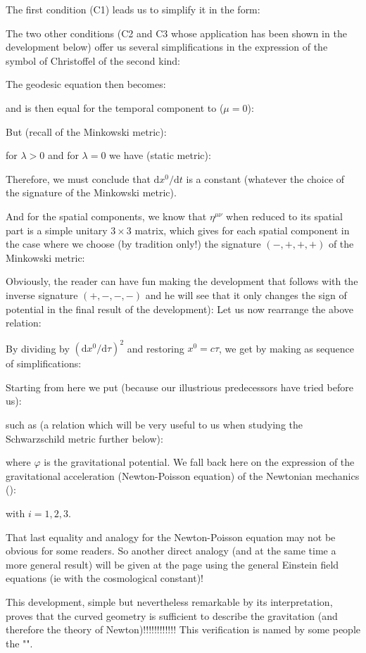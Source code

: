 	The first condition (C1) leads us to simplify it in the form:
	
	The two other conditions (C2 and C3 whose application has been shown in the development below) offer us several simplifications in the expression of the symbol of Christoffel of the second kind:
	
	The geodesic equation then becomes:
	
	and is then equal for the temporal component to ($\mu=0$):
	
	But (recall of the Minkowski metric):
	
	for $\lambda>0$ and for $\lambda=0$ we have (static metric):
	
	Therefore, we must conclude that $\mathrm{d}x^0/\mathrm{d}t$ is a constant (whatever the choice of the signature of the Minkowski metric).

	And for the spatial components, we know that $\eta^{\mu\nu}$ when reduced to its spatial part is a simple unitary $3\times 3$ matrix, which gives for each spatial component in the case where we choose (by tradition only!) the signature $(-, +, +, +)$ of the Minkowski metric:
	
	Obviously, the reader can have fun making the development that follows with the inverse signature $(+, -, -, -)$ and he will see that it only changes the sign of potential in the final result of the development):
	Let us now rearrange the above relation:
	
	By dividing by $(\mathrm{d}x^0/\mathrm{d}\tau)^2$ and restoring $x^0=c\tau$, we get by making as sequence of simplifications:
	
	Starting from here we put (because our illustrious predecessors have tried before us):
	
	such as (a relation which will be very useful to us when studying the Schwarzschild metric further below):
	
	where $\varphi$ is the gravitational potential. We fall back here on the expression of the gravitational acceleration (Newton-Poisson equation) of the Newtonian mechanics ():
	
	with $i=1,2,3$.
	\begin{tcolorbox}[title=Remark,colframe=black,arc=10pt]
	That last equality and analogy for the Newton-Poisson equation may not be obvious for some readers. So another direct analogy (and at the same time a more general result) will be given at the page \pageref{weak field approximation} using the general Einstein field equations (ie with the cosmological constant)!
	\end{tcolorbox}
	This development, simple but nevertheless remarkable by its interpretation, proves that the curved geometry is sufficient to describe the gravitation (and therefore the theory of Newton)!!!!!!!!!!!! This verification is named by some people the "".
	
